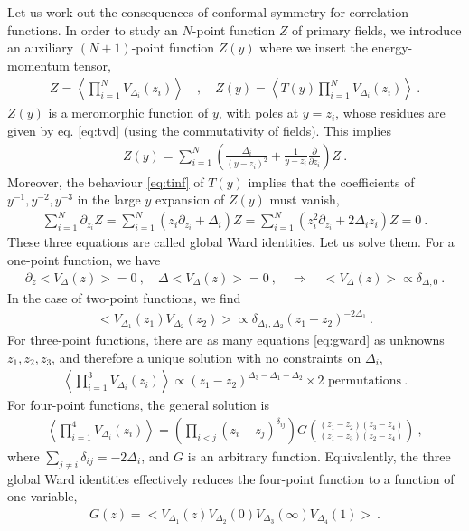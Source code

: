 \documentclass[12pt, a4paper]{article}
\theoremstyle{break}
\begin{document}
Let us work out the consequences of conformal symmetry for correlation functions.
In order to study an $N$-point function $Z$ of primary fields, we introduce an auxiliary $(N+1)$-point function $Z(y)$ where we insert the energy-momentum tensor,
\begin{align}
 Z = \left< \prod_{i=1}^N V_{\Delta_i}(z_i) \right> \quad , \quad Z(y) = \left< T(y) \prod_{i=1}^N V_{\Delta_i}(z_i) \right> \ .
\end{align}
$Z(y)$ is a meromorphic function of $y$, with poles at $y=z_i$, whose residues are given by eq. \eqref{eq:tvd} (using the commutativity of fields). This implies 
\begin{align}
 Z(y) = \sum_{i=1}^N \left(\frac{\Delta_i}{(y-z_i)^2} +\frac{1}{y-z_i}\frac{\partial}{\partial z_i}\right) Z\ .
 \label{eq:zy}
\end{align}
Moreover, the behaviour \eqref{eq:tinf} of $T(y)$ implies that 
the coefficients of $y^{-1}, y^{-2}, y^{-3}$ in the large $y$ expansion of $Z(y)$ must vanish, 
\begin{align}
 \sum_{i=1}^N \partial_{z_i} Z = \sum_{i=1}^N \left(z_i \partial_{z_i} + \Delta_i\right) Z = \sum_{i=1}^N \left(z_i^2 \partial_{z_i} + 2\Delta_iz_i\right) Z = 0\ .
 \label{eq:gward}
\end{align}
These three equations are called global Ward identities. 
Let us solve them. For a one-point function, we have 
\begin{align}
\partial_z \Big< V_\Delta(z)\Big> = 0 \ , \quad \Delta \Big< V_\Delta(z)\Big> = 0\ , \quad \Rightarrow \quad \Big< V_\Delta(z)\Big> \propto \delta_{\Delta, 0}\ .
\end{align}
In the case of two-point functions, we find 
\begin{align}
 \Big< V_{\Delta_1}(z_1)V_{\Delta_2}(z_2) \Big> \propto \delta_{\Delta_1,\Delta_2} (z_1-z_2)^{-2\Delta_1} \ .
 \label{eq:2pt}
\end{align}
For three-point functions, there are as many equations \eqref{eq:gward} as unknowns $z_1,z_2,z_3$, and therefore a unique solution with no constraints on $\Delta_i$,
\begin{align}
 \left< \prod_{i=1}^3 V_{\Delta_i}(z_i) \right> \propto (z_1-z_2)^{\Delta_3-\Delta_1-\Delta_2} 
 \times \text{$2$ permutations}\ .
 \label{eq:3pt}
\end{align}
For four-point functions, the general solution is
\begin{align}
 \left< \prod_{i=1}^4 V_{\Delta_i}(z_i) \right> = \left(\prod_{i<j}(z_i-z_j)^{\delta_{ij}}\right) G\left(\frac{(z_1-z_2)(z_3-z_4)}{(z_1-z_3)(z_2-z_4)}\right)\ ,
\end{align}
where $\sum_{j\neq i} \delta_{ij} = -2\Delta_i$, and $G$ is an arbitrary function.
Equivalently, the three global Ward identities effectively reduces the four-point function to a function of one variable,
 \begin{align}
  G(z) = \Big< V_{\Delta_1}(z) V_{\Delta_2}(0)V_{\Delta_3}(\infty)V_{\Delta_4}(1) \Big>\ .
 \end{align}
\end{document}
